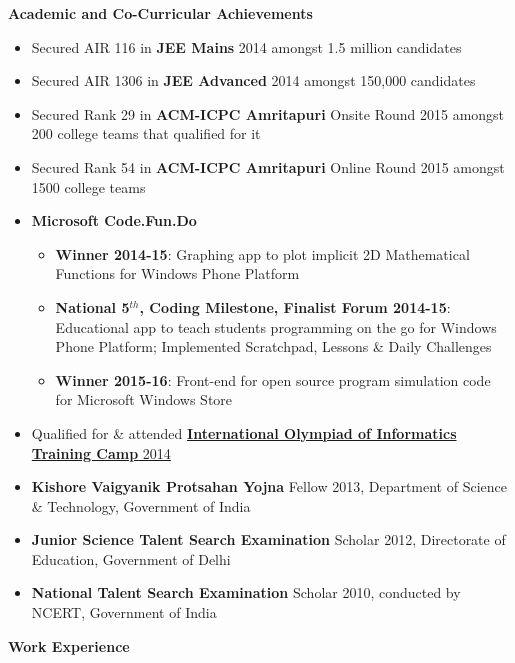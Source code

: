 \documentclass[letterpaper,11pt]{article}
\begin{document}
{\Large{\textbf{Academic and Co-Curricular Achievements}}
\small
\vspace{-2pt}
\begin{itemize}
    \item Secured AIR 116 in \textbf{JEE Mains} 2014 amongst 1.5 million candidates
    \item Secured AIR 1306 in \textbf{JEE Advanced} 2014 amongst 150,000 candidates
    \item Secured Rank 29 in \textbf{ACM-ICPC Amritapuri} Onsite Round 2015 amongst 200 college teams that qualified for it
    \item Secured Rank 54 in \textbf{ACM-ICPC Amritapuri} Online Round 2015 amongst 1500 college teams
    \item \textbf{Microsoft Code.Fun.Do}
        \begin{itemize}
            \item \textbf{Winner 2014-15}: Graphing app to plot implicit 2D Mathematical Functions for Windows Phone Platform
            \item \textbf{National 5$^{th}$, Coding Milestone, Finalist Forum 2014-15}: Educational app to teach students programming on the go for Windows Phone Platform; Implemented Scratchpad, Lessons \& Daily Challenges
            \item \textbf{Winner 2015-16}: Front-end for open source program simulation code for Microsoft Windows Store
        \end{itemize}
    \item Qualified for \& attended \href{http://www.iarcs.org.in/inoi/2014/inoi2014/results_inoi2014.php}{\textbf{International Olympiad of Informatics Training Camp} 2014}
    \item \textbf{Kishore Vaigyanik Protsahan Yojna} Fellow 2013, Department of Science \& Technology, Government of India
    \item \textbf{Junior Science Talent Search Examination} Scholar 2012, Directorate of Education, Government of Delhi
    \item \textbf{National Talent Search Examination} Scholar 2010, conducted by NCERT, Government of India
\end{itemize}

\Large{\textbf{Work Experience}}
\small
\vspace{-2pt}

}
\end{document}
